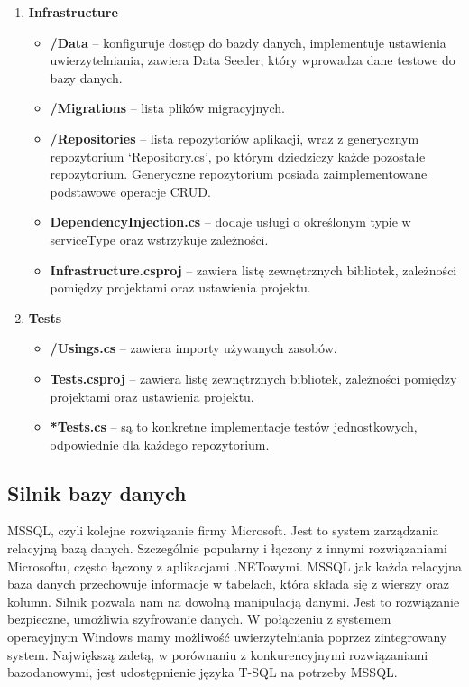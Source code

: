 \documentclass[a4paper,twoside,12pt]{book}
\begin{document}
\begin{enumerate}
    \item \textbf{Infrastructure} \begin{itemize}
        \item \textbf{/Data} -- konfiguruje dostęp do bazdy danych, implementuje ustawienia uwierzytelniania, zawiera Data Seeder, który wprowadza dane testowe do bazy danych.
        \item \textbf{/Migrations} -- lista plików migracyjnych.
        \item \textbf{/Repositories} -- lista repozytoriów aplikacji, wraz z generycznym repozytorium ‘Repository.cs’, po którym dziedziczy każde pozostałe repozytorium. Generyczne repozytorium posiada zaimplementowane podstawowe operacje CRUD.
        \item \textbf{DependencyInjection.cs} -- dodaje usługi o określonym typie w serviceType oraz wstrzykuje zależności.
        \item \textbf{Infrastructure.csproj} -- zawiera listę zewnętrznych bibliotek, zależności pomiędzy projektami oraz ustawienia projektu.
    \end{itemize}

    \item \textbf{Tests} \begin{itemize}
        \item \textbf{/Usings.cs} -- zawiera importy używanych zasobów.
        \item \textbf{Tests.csproj} -- zawiera listę zewnętrznych bibliotek, zależności pomiędzy projektami oraz ustawienia projektu.
        \item \textbf{*Tests.cs} -- są to konkretne implementacje testów jednostkowych, odpowiednie dla każdego repozytorium.
    \end{itemize}
\end{enumerate}

\subsection{Silnik bazy danych}
MSSQL, czyli kolejne rozwiązanie firmy Microsoft. Jest to system zarządzania relacyjną bazą danych. Szczególnie popularny i łączony z innymi rozwiązaniami Microsoftu, często łączony z aplikacjami .NETowymi. MSSQL jak każda relacyjna baza danych przechowuje informacje w tabelach, która składa się z wierszy oraz kolumn. Silnik pozwala nam na dowolną manipulacją danymi. Jest to rozwiązanie bezpieczne, umożliwia szyfrowanie danych. W połączeniu z systemem operacyjnym Windows mamy możliwość uwierzytelniania poprzez zintegrowany system. Największą zaletą, w porównaniu z konkurencyjnymi rozwiązaniami bazodanowymi, jest udostępnienie języka T-SQL na potrzeby MSSQL.
\end{document}
